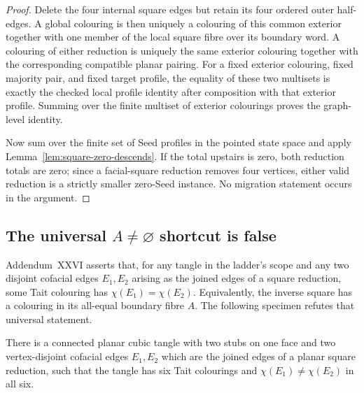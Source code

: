 \begin{proof}
Delete the four internal square edges but retain its four ordered outer
half-edges.  A global colouring is then uniquely a colouring of this common
exterior together with one member of the local square fibre over its boundary
word.  A colouring of either reduction is uniquely the same exterior
colouring together with the corresponding compatible planar pairing.
For a fixed exterior colouring, fixed majority pair, and fixed target
profile, the equality of these two multisets is exactly the checked local
profile identity after composition with that exterior profile.  Summing over
the finite multiset of exterior colourings proves the graph-level identity.

Now sum over the finite set of Seed profiles in the pointed state space and
apply Lemma~\ref{lem:square-zero-descends}.  If the total upstairs is zero,
both reduction totals are zero; since a facial-square reduction removes four
vertices, either valid reduction is a strictly smaller zero-Seed instance.
No migration statement occurs in the argument.
\end{proof}

\subsection{The universal \(A\ne\varnothing\) shortcut is false}

Addendum~XXVI asserts that, for any tangle in the ladder's scope and any two
disjoint cofacial edges \(E_1,E_2\) arising as the joined edges of a square
reduction, some Tait colouring has
\(\chi(E_1)=\chi(E_2)\).  Equivalently, the inverse square has a colouring in
its all-equal boundary fibre \(A\).  The following specimen refutes that
universal statement.

\begin{proposition}
\label{prop:a-nonempty-refuted}
There is a connected planar cubic tangle with two stubs on one face and two
vertex-disjoint cofacial edges \(E_1,E_2\) which are the joined edges of a
planar square reduction, such that the tangle has six Tait colourings and
\(\chi(E_1)\ne\chi(E_2)\) in all six.
\end{proposition}

